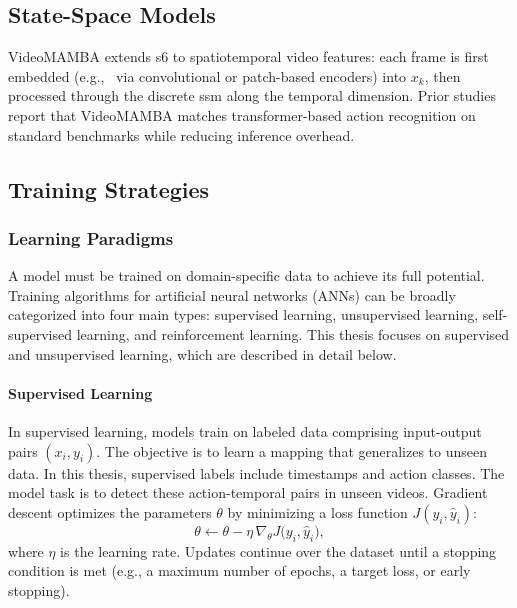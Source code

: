 \subsection{State-Space Models}
\label{ssec:state_space_models}

VideoMAMBA extends \acrshort{s6} to spatiotemporal video features: each frame is first embedded (e.g., \ via convolutional or patch-based encoders) into \(x_k\), then processed through the discrete \acrfull{ssm} along the temporal dimension. Prior studies \cite{lee_enhancing_mamba_s6_2024, li_videomamba_2024} report that VideoMAMBA matches transformer-based action recognition on standard benchmarks while reducing inference overhead.


\subsection{Training Strategies}
\label{ssec:training_stratergies}

\subsubsection{Learning Paradigms}
A model must be trained on domain-specific data to achieve its full potential. Training algorithms for artificial neural networks (ANNs) can be broadly categorized into four main types: supervised learning, unsupervised learning, self-supervised learning, and reinforcement learning. This thesis focuses on supervised and unsupervised learning, which are described in detail below.

\paragraph{Supervised Learning}
In supervised learning, models train on labeled data comprising input-output pairs \((x_i, y_i)\). The objective is to learn a mapping that generalizes to unseen data. In this thesis, supervised labels include timestamps and action classes. The model task is to detect these action-temporal pairs in unseen videos. Gradient descent optimizes the parameters \(\theta\) by minimizing a loss function \(J(y_i, \hat y_i)\):  
\[
\theta \leftarrow \theta - \eta \,\nabla_{\theta}J\bigl(y_i,\hat y_i\bigr),
\]
where \(\eta\) is the learning rate. Updates continue over the dataset until a stopping condition is met (e.g., a maximum number of epochs, a target loss, or early stopping).

